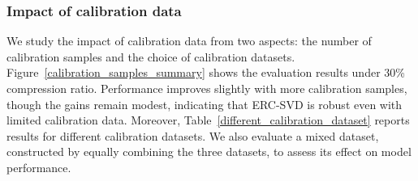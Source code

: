 \subsubsection{Impact of calibration data} \label{calibration-data}
We study the impact of calibration data from two aspects: the number of calibration samples and the choice of calibration datasets.
Figure~\ref{calibration_samples_summary} shows the evaluation results under 30\% compression ratio.
Performance improves slightly with more calibration samples, though the gains remain modest, indicating that ERC-SVD is robust even with limited calibration data.
Moreover, Table~\ref{different_calibration_dataset} reports results for different calibration datasets. We also evaluate a mixed dataset, constructed by equally combining the three datasets, to assess its effect on model performance.

